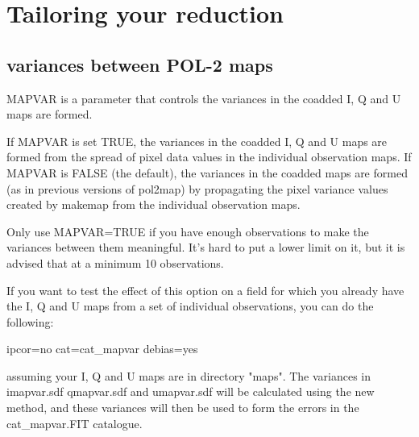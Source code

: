\section{Tailoring your reduction}

\subsection*{variances between POL-2 maps}

MAPVAR is a parameter that controls the variances in the coadded 
I, Q and U maps are formed.

If  MAPVAR is set TRUE, the variances in the coadded I, Q and U maps
are formed from the spread of pixel data values in the individual
observation maps. If MAPVAR is FALSE (the default), the variances in
the coadded maps are formed (as in previous versions of pol2map) by
propagating the pixel variance values created by makemap from the
individual observation maps.

Only use MAPVAR=TRUE if you have enough observations to
make the variances between them meaningful. It's hard to put a lower
limit on it, but it is advised that at a minimum 10 observations.


If you want to test the effect of this option on a field for which you
already have the I, Q and U maps from a set of individual
observations, you can do the following:

\begin{terminalv}
                   ipcor=no cat=cat_mapvar debias=yes
\end{terminalv}

assuming your I, Q and U maps are in directory "maps". The variances
in imapvar.sdf qmapvar.sdf and umapvar.sdf will be calculated using
the new method, and these variances will then be used to form the
errors in the cat_mapvar.FIT catalogue.



